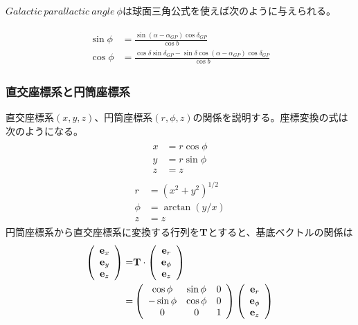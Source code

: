 $Galactic \ parallactic \ angle \ \phi$は球面三角公式を使えば次のように与えられる。

\begin{align}
\begin{aligned}
    \sin \phi &= \frac{\sin(\alpha-\alpha_{GP})\cos \delta_{GP}}{\cos b} \\
    \cos \phi &= \frac{\cos \delta \sin \delta_{GP} - \sin \delta \cos(\alpha-\alpha_{GP})\cos \delta_{GP}}{\cos b}
\end{aligned}
\end{align}

\subsubsection{直交座標系と円筒座標系}
直交座標系$(x,y,z)$、円筒座標系$(r,\phi,z)$の関係を説明する。座標変換の式は次のようになる。
\begin{align}
\begin{aligned}
    x &= r\cos{\phi}\\
    y &= r\sin{\phi}\\
    z &= z
\end{aligned}
\end{align}
\begin{align}
\begin{aligned}
    r &= (x^2 + y^2)^{1/2}\\
    \phi &= \arctan{(y/x)}\\
    z &= z
\end{aligned}
\end{align}
円筒座標系から直交座標系に変換する行列を$\bf{T}$とすると、基底ベクトルの関係は
\begin{align}
\begin{aligned}
    \left(
	\begin{array}{c}
	 	{\bf e}_{x}\\
		{\bf e}_{y}\\
		{\bf e}_{z}
	\end{array}
	\right)
	=& \bf{T} \cdot
	\left(
	\begin{array}{c}
	 	{\bf e}_{r}\\
		{\bf e}_{\phi}\\
		{\bf e}_{z}
	\end{array}
	\right)\\
	=&
	\left(
	\begin{array}{ccc}
	 	\cos{\phi} & \sin{\phi} & 0\\
		-\sin{\phi} & \cos{\phi} & 0\\
		0 & 0 & 1\\
	\end{array}
	\right)
	\left(
	\begin{array}{c}
	 	{\bf e}_{r}\\
		{\bf e}_{\phi}\\
		{\bf e}_{z}
	\end{array}
	\right)
\end{aligned}
\end{align}

